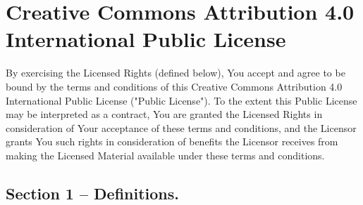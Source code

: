 \chapter{Creative Commons Attribution 4.0 International Public License}
\label{AppendixB}

By exercising the Licensed Rights (defined below), You accept and agree to be bound by the terms and conditions of this Creative Commons Attribution 4.0 International Public License ("Public License"). To the extent this Public License may be interpreted as a contract, You are granted the Licensed Rights in consideration of Your acceptance of these terms and conditions, and the Licensor grants You such rights in consideration of benefits the Licensor receives from making the Licensed Material available under these terms and conditions.

\section{Section 1 – Definitions.}
\label{section1}

